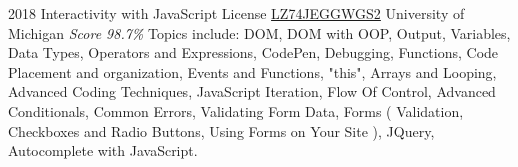 \documentclass[11pt,a4paper]{moderncv}
\begin{document}
\cventry
    {2018}
    {Interactivity with JavaScript}
    {License
        \href{https://www.coursera.org/account/accomplishments/records/LZ74JEGGWGS2}
        {LZ74JEGGWGS2}
    }
    {University of Michigan}
    {\textit{Score 98.7\%}}
    {
        Topics include:                                                          %
            DOM,                                                          %
            DOM with OOP,                                                          %
            Output,                                                          %
            Variables,                                                          %
            Data Types,                                                          %
            Operators and Expressions,                                                          %
            CodePen,                                                          %
            Debugging,                                                          %
            Functions,                                                          %
            Code Placement and organization,                                                          %
            Events and Functions,                                                          %
            "this",                                                          %
            Arrays and Looping,                                                          %
            Advanced Coding Techniques,                                                          %
            JavaScript Iteration,                                                          %
            Flow Of Control,                                                          %
            Advanced Conditionals,                                                          %
            Common Errors,                                                          %
            Validating Form Data,                                                          %
            Forms (                                                          %
                Validation,                                                          %
                Checkboxes and Radio Buttons,                                                          %
                Using Forms on Your Site                                                          %
                ),                                                          %
            JQuery,                                                          %
            Autocomplete with JavaScript.                                                          %
    }
\end{document}
